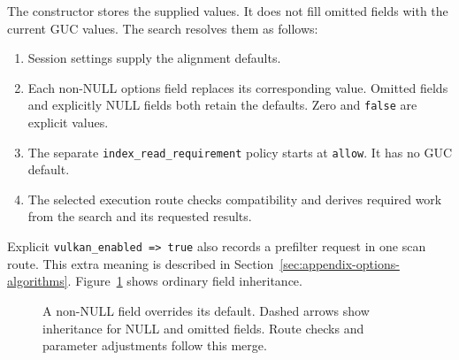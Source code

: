 The constructor stores the supplied values. It does not fill omitted fields
with the current GUC values. The search resolves them as follows:
\begin{enumerate}
  \item Session settings supply the alignment defaults.
  \item Each non-NULL options field replaces its corresponding value.
    Omitted fields and explicitly NULL fields both retain the defaults.
    Zero and \texttt{false} are explicit values.
  \item The separate \texttt{index\_read\_requirement} policy starts at
    \texttt{allow}. It has no GUC default.
  \item The selected execution route checks compatibility and derives
    required work from the search and its requested results.
\end{enumerate}

Explicit \texttt{vulkan\_enabled => true} also records a prefilter request
in one scan route. This extra meaning is described in
Section~\ref{sec:appendix-options-algorithms}.
Figure~\ref{fig:appendix-options-precedence} shows ordinary field inheritance.

\begin{figure}[htbp]
\centering
{}
\caption{A non-NULL field overrides its default. Dashed arrows show
inheritance for NULL and omitted fields. Route checks and parameter
adjustments follow this merge.}
\label{fig:appendix-options-precedence}
\end{figure}

